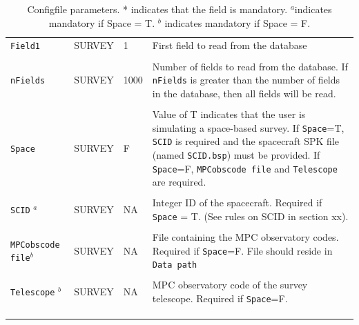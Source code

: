 \documentclass[10pt,a4paper]{article}
\begin{document}
\begin{longtable}{l l p{20mm} p{50mm}}
    \verb+Field1+             & SURVEY        & 1             & First field to read from the database \\ \\

    \verb+nFields+            & SURVEY        & 1000          & Number of fields to read from the database. 
                                                                If \verb+nFields+ is greater than the number of fields in the database,
                                                                then all fields will be read. \\ \\
                                                                
    \verb+Space+              & SURVEY        & F             & Value of T indicates that the user is simulating a space-based survey.
                                                               If \verb+Space+=T, \verb+SCID+ is required and the 
                                                               spacecraft SPK file (named \verb+SCID.bsp+) must be provided. If \verb+Space+=F,
                                                               \verb+MPCobscode file+ and \verb+Telescope+ are required. \\ \\
  
    \verb+SCID+ $^a$          & SURVEY        & NA            & Integer ID of the spacecraft. Required if \verb+Space+ = T. 
                                                               (See rules on SCID in section xx).\\ \\

    \verb+MPCobscode file+$^b$& SURVEY        & NA            & File containing the MPC observatory codes. Required if \verb+Space+=F.
                                                               File should reside in \verb+Data path+ \\ \\ 

    \verb+Telescope+ $^b$     & SURVEY        & NA            & MPC observatory code of the survey telescope. Required if \verb+Space+=F.\\ \\
\hline \\

\caption{Configfile parameters. * indicates that the field is mandatory. $^a$indicates mandatory if Space = T. $^b$ indicates mandatory if Space = F.}
\label{tab:desc}                                                                   
\end{longtable}
\end{document}
